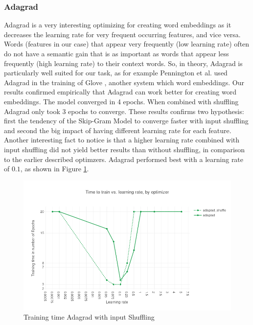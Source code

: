 \subsubsection{Adagrad}\label{ssec:results_adagrad}
Adagrad \citep{adagrad} is a very interesting optimizing for creating word embeddings as it decreases the learning rate for very frequent occurring features, and vice versa. Words (features in our case) that appear very frequently (low learning rate) often do not have a semantic gain  that is as important as words that appear less frequently (high learning rate) to their context words. So, in theory, Adagrad is particularly well suited for our task, as for example Pennington et al. used Adagrad in the training of Glove \citep{glove}, another system which word embeddings. Our results confirmed empirically that Adagrad can work better for creating word embeddings. The  model converged in 4 epochs. When combined with shuffling Adagrad only took 3 epochs to converge. These results confirms two hypothesis: first  the tendency of the Skip-Gram Model to converge faster with input shuffling and second  the big impact of having different learning rate for each feature.
Another interesting fact to notice is that a higher learning rate combined with input shuffling did not yield better results than without shuffling, in comparison to the earlier described optimzers. Adagrad performed best with a learning rate of $0.1$, as shown in Figure \ref{fig:results_adagrad_shuffle}.
\begin{figure}[h]
\centering
\includegraphics[scale=0.3]{images/results_adagrad_shuffle}
\caption{Training time Adagrad with input Shuffling}
\label{fig:results_adagrad_shuffle}
\end{figure}
